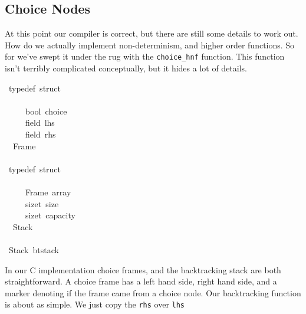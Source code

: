 \documentclass{book}
\theoremstyle{definition}
\begin{document}
{\subsection{Choice Nodes}

At this point our compiler is correct, but there are still some details to work out.
How do we actually implement non-determinism, and higher order functions.
So for we've swept it under the rug with the \texttt{choice\_hnf} function.
This function isn't terribly complicated conceptually, but it hides a lot of details.

\begin{tabbing}\ttfamily
~typedef~struct\\
\ttfamily ~\\
\ttfamily ~~~~~bool~choice\\
\ttfamily ~~~~~field~lhs\\
\ttfamily ~~~~~field~rhs\\
\ttfamily ~~Frame\\
\ttfamily ~\\
\ttfamily ~typedef~struct\\
\ttfamily ~\\
\ttfamily ~~~~~Frame~array\\
\ttfamily ~~~~~sizet~size\\
\ttfamily ~~~~~sizet~capacity\\
\ttfamily ~~Stack\\
\ttfamily ~\\
\ttfamily ~Stack~btstack
\end{tabbing}

In our C implementation choice frames, and the backtracking stack are both straightforward.
A choice frame has a left hand side, right hand side,
and a marker denoting if the frame came from a choice node.
Our backtracking function is about as simple.
We just copy the \texttt{rhs} over \texttt{lhs}

}
\end{document}
